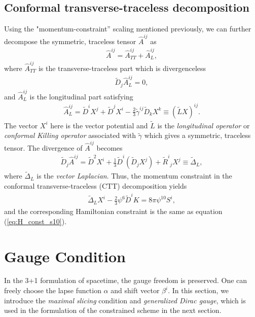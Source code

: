 \subsection{Conformal transverse-traceless decomposition}
\label{section1.3.3}
Using the "momentum-constraint” scaling mentioned previously,
we can further decompose the symmetric, traceless tensor $\hat{A}^{ij}$ as
\begin{align}\label{eq:CTT}
    \hat{A}^{ij} = \hat{A}^{ij}_{TT} + \hat{A}^{ij}_{L},
\end{align}
where $\hat{A}^{ij}_{TT}$ is the transverse-traceless part which is divergenceless
\begin{align}
    \tilde{D}_j \hat{A}^{ij}_{L} = 0,
\end{align}
and $\hat{A}^{ij}_{L}$ is the longitudinal part satisfying
\begin{align}
    \hat{A}^{ij}_{L} = \tilde{D}^i X^j + \tilde{D}^j X^i - \frac{2}{3}\tilde{\gamma}^{ij} \tilde{D}_k X^k \equiv \left(\tilde{L} X \right)^{ij}.
\end{align}
The vector $X^i$ here is the vector potential 
and $\tilde{L}$ is the \textit{longitudinal operator} or \textit{conformal Killing operator} associated with $\tilde{\gamma}$
which gives a symmetric, traceless tensor.
The divergence of $\hat{A}^{ij}$ becomes
\begin{align}\label{eq:vector_Lap}
    \tilde{D}_j \hat{A}^{ij} = \tilde{D}^2 X^i + \frac{1}{3} \tilde{D}^i \left( \tilde{D}_j X^j \right) + \tilde{R}^i{}_j X^j \equiv \tilde{\Delta}_{L},
\end{align}
where $\tilde{\Delta}_{L}$ is the \textit{vector Laplacian}.
Thus, the momentum constraint in the conformal transverse-traceless (CTT) decomposition yields
\begin{align}\label{eq:CTT_S_const}
    \tilde{\Delta}_L X^i - \frac{2}{3}\psi^6 \tilde{D}^i K = 8 \pi \psi^{10} S^i,
\end{align}
and the corresponding Hamiltonian constraint is the same as equation (\ref{eq:H_const_s10}).

\section{Gauge Condition}  %
\label{section1.4}
In the 3+1 formulation of spacetime, the gauge freedom is preserved.
One can freely choose the lapse function $\alpha$ and shift vector $\beta^i$.
In this section, we introduce the \textit{maximal slicing} condition and \textit{generalized Dirac gauge},
which is used in the formulation of the constrained scheme in the next section.

